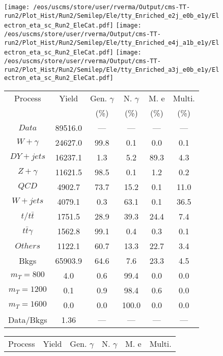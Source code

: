 \begin{figure}
\centering
\texttt{[image: /eos/uscms/store/user/rverma/Output/cms-TT-run2/Plot\_Hist/Run2/Semilep/Ele/tty\_Enriched\_e2j\_e0b\_e1y/Electron\_eta\_sc\_Run2\_EleCat.pdf]}
\texttt{[image: /eos/uscms/store/user/rverma/Output/cms-TT-run2/Plot\_Hist/Run2/Semilep/Ele/tty\_Enriched\_e4j\_a1b\_e1y/Electron\_eta\_sc\_Run2\_EleCat.pdf]}
\texttt{[image: /eos/uscms/store/user/rverma/Output/cms-TT-run2/Plot\_Hist/Run2/Semilep/Ele/tty\_Enriched\_a3j\_e0b\_e1y/Electron\_eta\_sc\_Run2\_EleCat.pdf]}
\begin{minipage}[c]{0.32\textwidth}
\centering
\tiny{
\begin{tabular}{cccccc}
\hline
Process & Yield & Gen. $\gamma$ & N. $\gamma$ & M. e & Multi. \\
 &  & (\%) & (\%) & (\%) & (\%)  \\
\hline
                                                                      $ Data $ &  89516.0 &  --- &  --- &  --- &  ---\\
$ W+\gamma $ &  24627.0 &  99.8 &  0.1 &  0.0 &  0.1\\
$ DY+jets $ &  16237.1 &  1.3 &  5.2 &  89.3 &  4.3\\
$ Z+\gamma $ &  11621.5 &  98.5 &  0.1 &  1.2 &  0.2\\
$ QCD $ &  4902.7 &  73.7 &  15.2 &  0.1 &  11.0\\
$ W+jets $ &  4079.1 &  0.3 &  63.1 &  0.1 &  36.5\\
$ t/t\bar{t} $ &  1751.5 &  28.9 &  39.3 &  24.4 &  7.4\\
$ t\bar{t}\gamma $ &  1562.8 &  99.1 &  0.4 &  0.3 &  0.1\\
$ Others $ &  1122.1 &  60.7 &  13.3 &  22.7 &  3.4\\
Bkgs &  65903.9 &  64.6 &  7.6 &  23.3 &  4.5\\
$ m_{T} = 800 $ &  4.0 &  0.6 &  99.4 &  0.0 &  0.0\\
$ m_{T} = 1200 $ &  0.1 &  0.9 &  98.4 &  0.6 &  0.0\\
$ m_{T} = 1600 $ &  0.0 &  0.0 &  100.0 &  0.0 &  0.0\\
Data/Bkgs &  1.36 &  --- &  --- &  --- &  ---\\
\hline
\end{tabular}
}
\end{minipage}
\begin{minipage}[c]{0.32\textwidth}
\centering
\tiny{
\begin{tabular}{cccccc}
\hline
Process & Yield & Gen. $\gamma$ & N. $\gamma$ & M. e & Multi. \\

\end{tabular}}
\end{minipage}
\end{figure}
